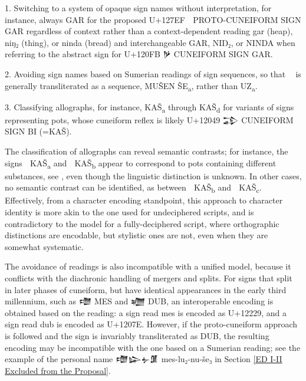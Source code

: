 1. Switching to a system of opaque sign names without interpretation,
for instance, always GAR for the proposed U+127EF {\pcxxv 𒟯} PROTO-CUNEIFORM
SIGN GAR regardless of context rather than a context-dependent reading
gar (heap), niŋ₂ (thing), or ninda (bread) and interchangeable GAR,
NIŊ₂, or NINDA when referring to the abstract sign for U+120FB {\oraccnoto 𒃻}
CUNEIFORM SIGN GAR.

2. Avoiding sign names based on Sumerian readings of sign sequences,
so that {\pcxxv 𒤤𒨢} is generally transliterated as a sequence, MUŠEN
ŠE\textsubscript{a}, rather than UZ\textsubscript{a}.

3. Classifying allographs, for instance, KAŠ\textsubscript{a} through
KAŠ\textsubscript{d} for variants of signs representing pots, whose
cuneiform reflex is likely U+12049 {\oraccnoto 𒁉} CUNEIFORM SIGN BI
(=KAŠ).

The classification of allographs can reveal semantic contrasts; for
instance, the signs {\pcxxv 𒢅} KAŠ\textsubscript{a} and {\pcxxv 𒢆}
KAŠ\textsubscript{b} appear to correspond to pots containing different
substances, see \cite[168]{Englund1998}, even though the linguistic
distinction is unknown. In other cases, no semantic contrast can be
identified, as between {\pcxxv 𒢆} KAŠ\textsubscript{b} and {\pcxxv 𒢈}
KAŠ\textsubscript{c}. Effectively, from a character encoding
standpoint, this approach to character identity is more akin to the
one used for undeciphered scripts, and is contradictory to the model
for a fully-deciphered script, where orthographic distinctions are
encodable, but stylistic ones are not, even when they are somewhat
systematic.

The avoidance of readings is also incompatible with a unified model,
because it conflicts with the diachronic handling of mergers and
splits. For signs that split in later phases of cuneiform, but have
identical appearances in the early third millennium, such as
{\oraccnoto 𒈩} MES and {\oraccnoto 𒁾} DUB, an interoperable encoding
is obtained based on the reading: a sign read mes is encoded as
U+12229, and a sign read dub is encoded as U+1207E. However, if the
proto-cuneiform approach is followed and the sign is invariably
transliterated as DUB, the resulting encoding may be incompatible with
the one based on a Sumerian reading; see the example of the personal
name {\oraccnoto 𒈩𒇽𒉡𒂠} mes-lu₂-nu-še₃ in Section \ref{ED I-II Excluded
from the Proposal}.

